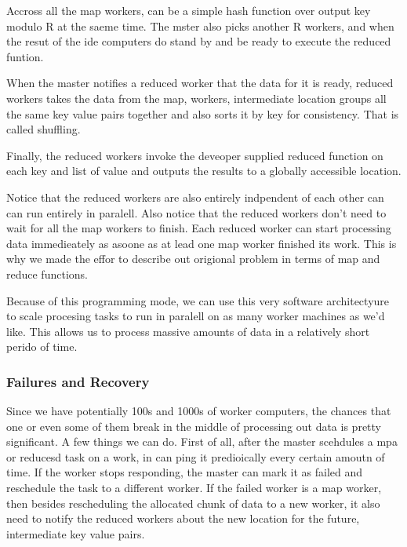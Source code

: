 \documentclass[a4paper, 11pt]{book}
\begin{document}
{    Accross all the map workers, can be a simple hash function over output key modulo R at the saeme time.
    The mster also picks another R workers, and when the resut of the ide computers do stand by and be ready to execute the reduced funtion.

    When the master notifies a reduced worker that the data for it is ready, reduced workers takes the data from the map, workers, intermediate location groups all the same key value pairs together and also sorts it by key for consistency.
    That is called shuffling.

    Finally, the reduced workers invoke the deveoper supplied reduced function on each key and list of value and outputs the results to a globally accessible location.

    Notice that the reduced workers are also entirely indpendent of each other can can run entirely in paralell.
    Also notice that the reduced workers don't need to wait for all the map workers to finish.
    Each reduced worker can start processing data immedieately as asoone as at lead one map worker finished its work.
    This is why we made the effor to describe out origional problem in terms of map and reduce functions.

    Because of this programming mode, we can use this very software architectyure to scale procesing tasks to run in paralell on as many worker machines as we'd like.
    This allows us to process massive amounts of data in a relatively short perido of time.

    \subsubsection{Failures and Recovery}
    Since we have potentially 100s and 1000s of worker computers, the chances that one or even some of them break in the middle of processing out data is pretty significant.
    A few things we can do.
    First of all, after the master scehdules a mpa or reducesd task on a work, in can ping it predioically every certain amoutn of time.
    If the worker stops responding, the master can mark it as failed and reschedule the task to a different worker.
    If the failed worker is a map worker, then besides rescheduling the allocated chunk of data to a new worker, it also need to notify the reduced workers about the new location for the future, intermediate key value pairs.

}
\end{document}
